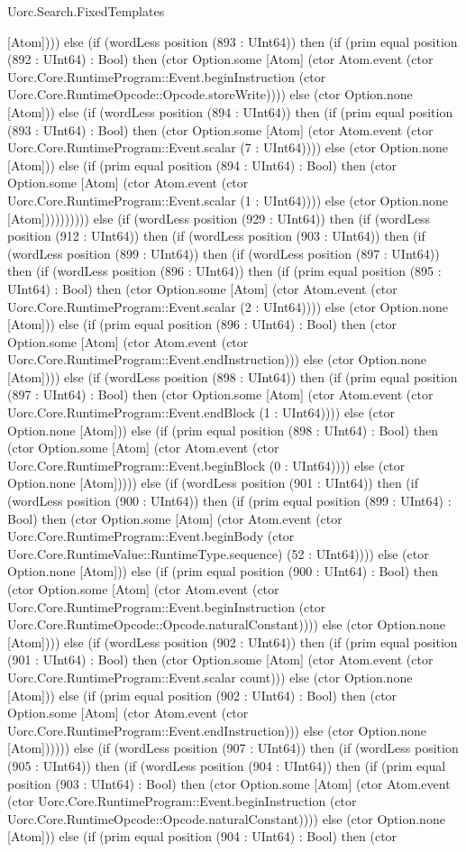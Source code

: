 \begin{lexlean}{Uorc.Search.FixedTemplates}
\begin{semanticmodule}
{[Atom]))) else (if (wordLess position (893 : UInt64)) then (if (prim equal position (892 : UInt64) : Bool) then (ctor Option.some [Atom] (ctor Atom.event (ctor Uorc.Core.RuntimeProgram::Event.beginInstruction (ctor Uorc.Core.RuntimeOpcode::Opcode.storeWrite)))) else (ctor Option.none [Atom])) else (if (wordLess position (894 : UInt64)) then (if (prim equal position (893 : UInt64) : Bool) then (ctor Option.some [Atom] (ctor Atom.event (ctor Uorc.Core.RuntimeProgram::Event.scalar (7 : UInt64)))) else (ctor Option.none [Atom])) else (if (prim equal position (894 : UInt64) : Bool) then (ctor Option.some [Atom] (ctor Atom.event (ctor Uorc.Core.RuntimeProgram::Event.scalar (1 : UInt64)))) else (ctor Option.none [Atom]))))))))) else (if (wordLess position (929 : UInt64)) then (if (wordLess position (912 : UInt64)) then (if (wordLess position (903 : UInt64)) then (if (wordLess position (899 : UInt64)) then (if (wordLess position (897 : UInt64)) then (if (wordLess position (896 : UInt64)) then (if (prim equal position (895 : UInt64) : Bool) then (ctor Option.some [Atom] (ctor Atom.event (ctor Uorc.Core.RuntimeProgram::Event.scalar (2 : UInt64)))) else (ctor Option.none [Atom])) else (if (prim equal position (896 : UInt64) : Bool) then (ctor Option.some [Atom] (ctor Atom.event (ctor Uorc.Core.RuntimeProgram::Event.endInstruction))) else (ctor Option.none [Atom]))) else (if (wordLess position (898 : UInt64)) then (if (prim equal position (897 : UInt64) : Bool) then (ctor Option.some [Atom] (ctor Atom.event (ctor Uorc.Core.RuntimeProgram::Event.endBlock (1 : UInt64)))) else (ctor Option.none [Atom])) else (if (prim equal position (898 : UInt64) : Bool) then (ctor Option.some [Atom] (ctor Atom.event (ctor Uorc.Core.RuntimeProgram::Event.beginBlock (0 : UInt64)))) else (ctor Option.none [Atom])))) else (if (wordLess position (901 : UInt64)) then (if (wordLess position (900 : UInt64)) then (if (prim equal position (899 : UInt64) : Bool) then (ctor Option.some [Atom] (ctor Atom.event (ctor Uorc.Core.RuntimeProgram::Event.beginBody (ctor Uorc.Core.RuntimeValue::RuntimeType.sequence) (52 : UInt64)))) else (ctor Option.none [Atom])) else (if (prim equal position (900 : UInt64) : Bool) then (ctor Option.some [Atom] (ctor Atom.event (ctor Uorc.Core.RuntimeProgram::Event.beginInstruction (ctor Uorc.Core.RuntimeOpcode::Opcode.naturalConstant)))) else (ctor Option.none [Atom]))) else (if (wordLess position (902 : UInt64)) then (if (prim equal position (901 : UInt64) : Bool) then (ctor Option.some [Atom] (ctor Atom.event (ctor Uorc.Core.RuntimeProgram::Event.scalar count))) else (ctor Option.none [Atom])) else (if (prim equal position (902 : UInt64) : Bool) then (ctor Option.some [Atom] (ctor Atom.event (ctor Uorc.Core.RuntimeProgram::Event.endInstruction))) else (ctor Option.none [Atom]))))) else (if (wordLess position (907 : UInt64)) then (if (wordLess position (905 : UInt64)) then (if (wordLess position (904 : UInt64)) then (if (prim equal position (903 : UInt64) : Bool) then (ctor Option.some [Atom] (ctor Atom.event (ctor Uorc.Core.RuntimeProgram::Event.beginInstruction (ctor Uorc.Core.RuntimeOpcode::Opcode.naturalConstant)))) else (ctor Option.none [Atom])) else (if (prim equal position (904 : UInt64) : Bool) then (ctor }
\end{semanticmodule}
\end{lexlean}
